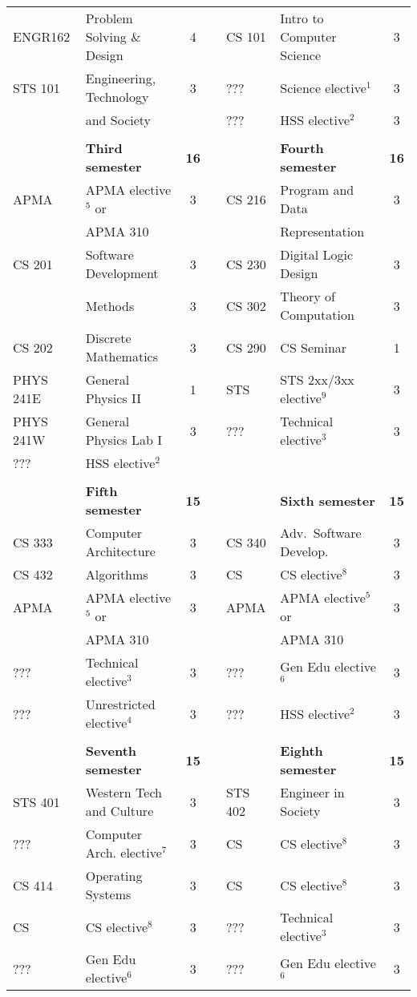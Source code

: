 \documentclass[12pt,twoside]{article}
\begin{document}
{\begin{tabular}{llccllc}
ENGR162 & Problem Solving \& Design 		& 4 & & CS 101 & Intro to Computer Science & 3 \\
STS 101 & Engineering, Technology 		& 3 & & ??? & Science elective$^1$ & 3 \\
& and Society 	       				& & & ??? & HSS elective$^2$ & 3 \\
\\
& \bf Third semester				& \bf 16 & & & \bf Fourth semester & \bf 16 \\
APMA & APMA elective$^5$ or	 		& 3 & & CS 216 & Program and Data & 3 \\
& APMA 310 					& & & & Representation & \\
CS 201 & Software Development 			& 3 & & CS 230 & Digital Logic Design & 3 \\
& Methods 					& 3 & & CS 302 & Theory of Computation & 3 \\
CS 202 & Discrete Mathematics 			& 3 & & CS 290 & CS Seminar & 1 \\
PHYS 241E & General Physics II 			& 1 & & STS & STS 2xx/3xx elective$^9$ & 3 \\
PHYS 241W & General Physics Lab I 		& 3 & & ??? & Technical elective$^3$ & 3 \\
??? & HSS elective$^2$ 				\\
\\
& \bf Fifth semester				& \bf 15 & & & \bf Sixth semester & \bf 15 \\
CS 333 & Computer Architecture 			& 3 & & CS 340 & Adv.\ Software Develop. & 3 \\
CS 432 & Algorithms 				& 3 & & CS & CS elective$^8$ & 3 \\
APMA & APMA elective$^5$ or 			& 3 & & APMA & APMA elective$^5$ or & 3 \\
& APMA 310  		 			& & & & APMA 310 & \\
??? & Technical elective$^3$ 			& 3 & & ??? & Gen Edu elective$^6$ & 3 \\
??? & Unrestricted elective$^4$ 		& 3 & & ??? & HSS elective$^2$ & 3 \\
\\
& \bf Seventh semester				& \bf 15 & & & \bf Eighth semester & \bf 15 \\
STS 401 & Western Tech and Culture 		& 3 & & STS 402 & Engineer in Society & 3 \\
??? & Computer Arch. elective$^7$ 		& 3 & & CS & CS elective$^8$ & 3 \\
CS 414 & Operating Systems 			& 3 & & CS & CS elective$^8$ & 3 \\
CS & CS elective$^8$ 				& 3 & & ??? & Technical elective$^3$ & 3 \\
??? & Gen Edu elective$^6$ 			& 3 & & ??? & Gen Edu elective$^6$ & 3
\end{tabular}
}
\end{document}
